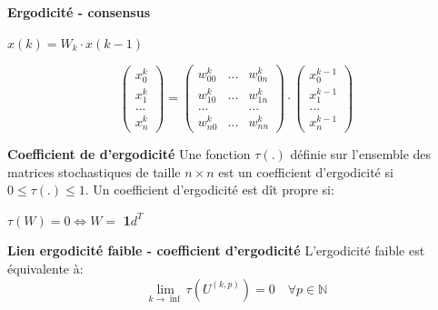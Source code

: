\documentclass{beamer}
\begin{document}
\begin{frame}
	\textbf{Ergodicité - consensus}

	\begin{center}		
		$ x(k) = W_k \cdot x(k-1)$
	\end{center}

	\begin{equation}
		\nonumber
		\begin{pmatrix}
			x^k_0\\
			x^k_1\\
			...\\
			x^k_n
		\end{pmatrix}
		=
		\begin{pmatrix}
			w^k_{00} & ... & w^k_{0n}\\
			w^k_{10} & ... & w^k_{1n}\\
			... &  & ... \\
			w^k_{n0} & ... & w^k_{nn}
		\end{pmatrix}
		\cdot
		\begin{pmatrix}
			x^{k-1}_0\\
			x^{k-1}_1\\
			...\\
			x^{k-1}_n
		\end{pmatrix}
	\end{equation}
\end{frame}

\begin{frame}
	\textbf{Coefficient de d'ergodicité}
		Une fonction $\tau(.)$ définie sur l'ensemble des matrices stochastiques de taille $n \times n$ est un coefficient d'ergodicité si $0 \leq \tau(.) \leq 1$.
		\bigbreak
		\pause
		Un coefficient d'ergodicité est dît propre si:
		\begin{center}
			$\tau(W) = 0 \iff W = $ \textbf{1}$d^T$
		\end{center}
\end{frame}

\begin{frame}
	\textbf{Lien ergodicité faible - coefficient d'ergodicité}
	L'ergodicité faible est équivalente à:
	\begin{equation}
		\nonumber
		\lim_{k \to \inf} \tau(U^{(k, p)}) = 0 \quad \forall p \in \mathbb{N} 
	\end{equation}
\end{frame}
\end{document}
